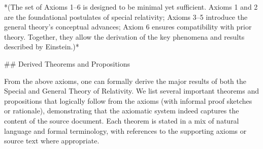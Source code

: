 \documentclass{article}
\begin{document}
*(The set of Axioms 1–6 is designed to be minimal yet sufficient. Axioms 1 and 2 are the foundational postulates of special relativity; Axioms 3–5 introduce the general theory’s conceptual advances; Axiom 6 ensures compatibility with prior theory. Together, they allow the derivation of the key phenomena and results described by Einstein.)*

## Derived Theorems and Propositions

From the above axioms, one can formally derive the major results of both the Special and General Theory of Relativity. We list several important theorems and propositions that logically follow from the axioms (with informal proof sketches or rationale), demonstrating that the axiomatic system indeed captures the content of the source document. Each theorem is stated in a mix of natural language and formal terminology, with references to the supporting axioms or source text where appropriate.
\end{document}

